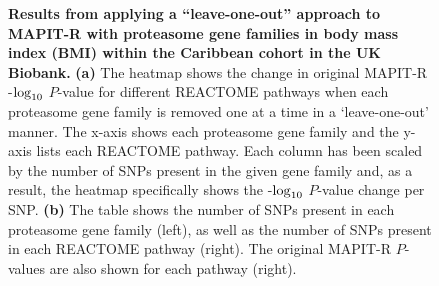 \documentclass[10pt]{article}
\def\log{{\rm log}}
\begin{document}
\begin{figure}[H]
{\begin{tabular}{|cc|ccc|}
  \hline
\end{tabular}}
\caption{\textbf{Results from applying a ``leave-one-out'' approach to MAPIT-R with proteasome gene families in body mass index (BMI) within the Caribbean cohort in the UK Biobank.} \textbf{(a)} The heatmap shows the change in original MAPIT-R -$\log_{10}$ $P$-value for different REACTOME pathways when each proteasome gene family is removed one at a time in a `leave-one-out' manner. The x-axis shows each proteasome gene family and the y-axis lists each REACTOME pathway. Each column has been scaled by the number of SNPs present in the given gene family and, as a result, the heatmap specifically shows the -$\log_{10}$ $P$-value change per SNP. \textbf{(b)} The table shows the number of SNPs present in each proteasome gene family (left), as well as the number of SNPs present in each REACTOME pathway (right). The original MAPIT-R $P$-values are also shown for each pathway (right).}
\label{InterPath-Supp-Figure-Prot-Heatplots-Caribbean}
\end{figure}
\clearpage
\end{document}
